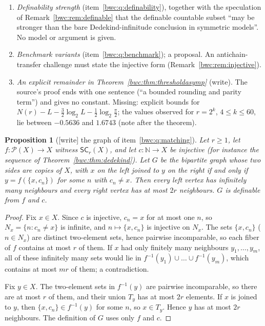 \documentclass[11pt,letterpaper]{article}
\numberwithin{equation}{section}
\theoremstyle{plain}
\newtheorem{proposition}[proposition]{Proposition}
\theoremstyle{definition}
\theoremstyle{remark}
\newcommand{\Pow}{\mathcal P}
\newcommand{\NN}{\mathbb N}
\newcommand{\SC}{\mathsf{SC}}
\begin{document}
\begin{enumerate}[label=F\arabic*.,ref=F\arabic*]
\item\label{bwc:fq:definability} \emph{Definability strength}
 (item~\ref{bwc:q:definability}), together with the speculation of
 Remark~\ref{bwc:rem:definable} that the definable countable subset ``may be
 stronger than the bare Dedekind-infinitude conclusion in symmetric models''.
 No model or argument is given.
\item\label{bwc:fq:benchmark} \emph{Benchmark variants}
 (item~\ref{bwc:q:benchmark}); a proposal. An antichain-transfer challenge must
 state the injective form (Remark~\ref{bwc:rem:injective}).
\item\label{bwc:fq:remainder} \emph{An explicit remainder in
 Theorem~\ref{bwc:thm:thresholdasymp}} (write). The source's proof ends with
 one sentence (``a bounded rounding and parity term'') and gives no constant.
 Missing: explicit bounds for
 $N(r)-L-\tfrac32\log_2L-\tfrac12\log_2\tfrac\pi2$; the values observed for
 $r=2^k$, $4\leq k\leq60$, lie between $-0.5636$ and $1.6743$ (note after the
 theorem).
\end{enumerate}

\begin{proposition}[{[write]} the graph of item~\ref{bwc:q:matching}]\label{bwc:prop:matching}
Let $r\geq1$, let $f:\Pow(X)\to X$ witness $\SC_r(X)$, and let
$c:\NN\to X$ be injective (for instance the sequence of
Theorem~\ref{bwc:thm:dedekind}). Let $G$ be the bipartite graph whose two
sides are copies of $X$, with $x$ on the left joined to $y$ on the right if
and only if $y=f(\{x,c_n\})$ for some $n$ with $c_n\neq x$. Then every left
vertex has infinitely many neighbours and every right vertex has at most $2r$
neighbours. $G$ is definable from $f$ and $c$.
\end{proposition}

\begin{proof}
Fix $x\in X$. Since $c$ is injective, $c_n=x$ for at most one $n$, so
$N_x=\{n:c_n\neq x\}$ is infinite, and $n\mapsto\{x,c_n\}$ is injective on
$N_x$. The sets $\{x,c_n\}$ ($n\in N_x$) are distinct two-element sets, hence
pairwise incomparable, so each fiber of $f$ contains at most $r$ of them. If
$x$ had only finitely many neighbours $y_1,\dots,y_m$, all of these
infinitely many sets would lie in $f^{-1}(y_1)\cup\dots\cup f^{-1}(y_m)$,
which contains at most $mr$ of them; a contradiction.

Fix $y\in X$. The two-element sets in $f^{-1}(y)$ are pairwise incomparable,
so there are at most $r$ of them, and their union $T_y$ has at most $2r$
elements. If $x$ is joined to $y$, then $\{x,c_n\}\in f^{-1}(y)$ for some $n$,
so $x\in T_y$. Hence $y$ has at most $2r$ neighbours. The definition of $G$
uses only $f$ and $c$.
\end{proof}
\end{document}
